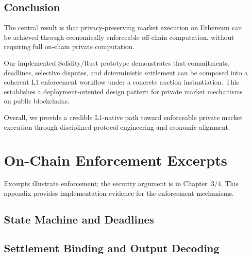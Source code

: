 \documentclass[final,twoside]{vutinfth}
\begin{document}
\section{Conclusion}
The central result is that privacy-preserving market execution on Ethereum can
be achieved through economically enforceable off-chain computation, without
requiring full on-chain private computation.

Our implemented Solidity/Rust prototype demonstrates that commitments,
deadlines, selective disputes, and deterministic settlement can be composed
into a coherent L1 enforcement workflow under a concrete auction
instantiation.
This establishes a deployment-oriented design pattern for private market
mechanisms on public blockchains.

Overall, we provide a credible L1-native path toward enforceable private market
execution through disciplined protocol engineering and economic alignment.

\appendix

\chapter{On-Chain Enforcement Excerpts}
\label{app:onchain}
Excerpts illustrate enforcement; the security argument is in Chapter~3/4.
This appendix provides implementation evidence for the enforcement mechanisms.

\section{State Machine and Deadlines}
\label{app:a1}






\section{Settlement Binding and Output Decoding}
\label{app:a2}

\end{document}
